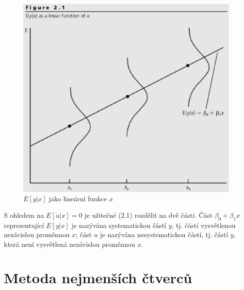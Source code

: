 \begin{figure}[htp]
\centering
\includegraphics[scale = 0.5]{pictures/figure_2_1.eps}
\caption{$E[y|x]$ jako lineární funkce $x$}
\label{figure_2_1}
\end{figure} 

S ohledem na $E[u|x] = 0$ je užitečné (2.1) rozdělit na dvě části. Část $\beta_0 + \beta_1 x$ reprezentující $E[y|x]$ je nazývána systematickou částí $y$, tj. částí vysvětlenou nezávislou proměnnou $x$; část $u$ je 
nazývána nesystematickou částí, tj. částí $y$, která není vysvětlená nezávislou proměnnou $x$.

\section{Metoda nejmenších čtverců}

